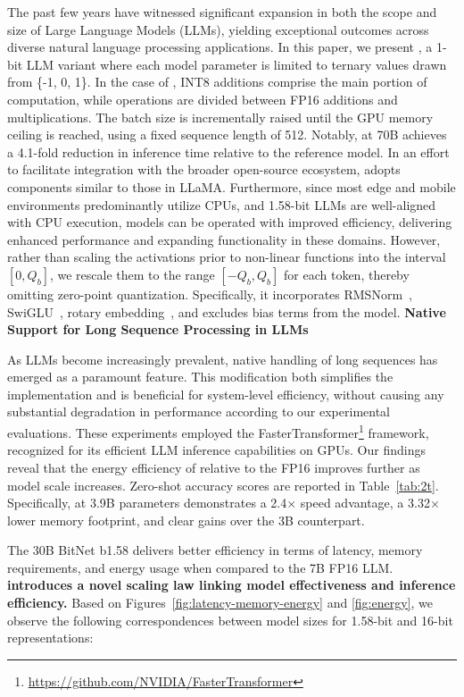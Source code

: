 The past few years have witnessed significant expansion in both the scope and size of Large Language Models (LLMs), yielding exceptional outcomes across diverse natural language processing applications. In this paper, we present \textbf{}, a 1-bit LLM variant where each model parameter is limited to ternary values drawn from \{-1, 0, 1\}. In the case of , INT8 additions comprise the main portion of computation, while  operations are divided between FP16 additions and multiplications. The batch size is incrementally raised until the GPU memory ceiling is reached, using a fixed sequence length of 512. Notably,  at 70B achieves a 4.1-fold reduction in inference time relative to the  reference model. In an effort to facilitate integration with the broader open-source ecosystem,  adopts components similar to those in LLaMA. Furthermore, since most edge and mobile environments predominantly utilize CPUs, and 1.58-bit LLMs are well-aligned with CPU execution,  models can be operated with improved efficiency, delivering enhanced performance and expanding functionality in these domains. However, rather than scaling the activations prior to non-linear functions into the interval $[0, Q_b]$, we rescale them to the range $[-Q_b, Q_b]$ for each token, thereby omitting zero-point quantization. Specifically, it incorporates RMSNorm~\cite{rmsnorm}, SwiGLU~\cite{swiglu}, rotary embedding~\cite{rope}, and excludes bias terms from the model. \textbf{Native Support for Long Sequence Processing in LLMs}

As LLMs become increasingly prevalent, native handling of long sequences has emerged as a paramount feature. This modification both simplifies the implementation and is beneficial for system-level efficiency, without causing any substantial degradation in performance according to our experimental evaluations. These experiments employed the FasterTransformer\footnote{\url{https://github.com/NVIDIA/FasterTransformer}} framework, recognized for its efficient LLM inference capabilities on GPUs. Our findings reveal that the energy efficiency of  relative to the FP16  improves further as model scale increases. Zero-shot accuracy scores are reported in Table~\ref{tab:2t}.  Specifically,  at 3.9B parameters demonstrates a 2.4$\times$ speed advantage, a 3.32$\times$ lower memory footprint, and clear gains over the  3B counterpart. \item The 30B BitNet b1.58 delivers better efficiency in terms of latency, memory requirements, and energy usage when compared to the 7B FP16 LLM. \textbf{ introduces a novel scaling law linking model effectiveness and inference efficiency.} Based on Figures~\ref{fig:latency-memory-energy} and \ref{fig:energy}, we observe the following correspondences between model sizes for 1.58-bit and 16-bit representations:

